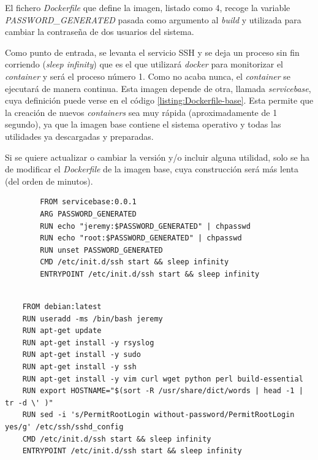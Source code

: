 El fichero \emph{Dockerfile} que define la imagen, listado como 4, recoge la variable \emph{PASSWORD\_GENERATED} pasada como argumento al \emph{build} y utilizada para cambiar la contraseña
de dos usuarios del sistema. 

Como punto de entrada, se levanta el servicio SSH y se deja un proceso sin fin
corriendo (\emph{sleep infinity}) que es el que utilizará \emph{docker} para monitorizar el \emph{container} y será el proceso
número 1. Como no acaba nunca, el \emph{container} se ejecutará de manera continua. 
Esta imagen depende de otra, llamada \emph{servicebase}, cuya definición puede verse en el código \ref{listing:Dockerfile-base}. 
Esta permite que la creación de nuevos \emph{containers} sea muy rápida (aproximadamente de 1 segundo), ya que 
la imagen base contiene el sistema operativo y todas las utilidades ya descargadas y preparadas.

Si se quiere actualizar o cambiar la versión y/o incluir alguna utilidad, solo se ha de modificar el \emph{Dockerfile}
de la imagen base, cuya construcción será más lenta (del orden de minutos).

    \begin{verbatim}
        FROM servicebase:0.0.1
        ARG PASSWORD_GENERATED
        RUN echo "jeremy:$PASSWORD_GENERATED" | chpasswd
        RUN echo "root:$PASSWORD_GENERATED" | chpasswd
        RUN unset PASSWORD_GENERATED
        CMD /etc/init.d/ssh start && sleep infinity
        ENTRYPOINT /etc/init.d/ssh start && sleep infinity
        
    \end{verbatim}
    


\begin{verbatim}
    FROM debian:latest
    RUN useradd -ms /bin/bash jeremy
    RUN apt-get update
    RUN apt-get install -y rsyslog
    RUN apt-get install -y sudo
    RUN apt-get install -y ssh
    RUN apt-get install -y vim curl wget python perl build-essential
    RUN export HOSTNAME="$(sort -R /usr/share/dict/words | head -1 | tr -d \' )"
    RUN sed -i 's/PermitRootLogin without-password/PermitRootLogin yes/g' /etc/ssh/sshd_config
    CMD /etc/init.d/ssh start && sleep infinity
    ENTRYPOINT /etc/init.d/ssh start && sleep infinity
\end{verbatim}




